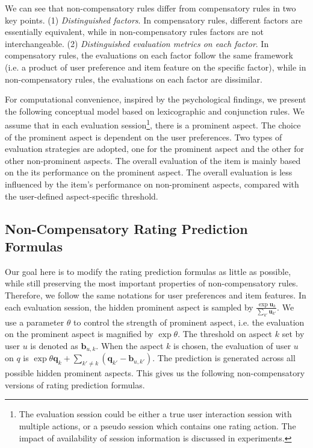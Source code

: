 \documentclass[letterpaper]{article} %
\begin{document}
We can see that non-compensatory rules differ from compensatory rules in two key points. (1) \textit{Distinguished factors}. In compensatory rules, different factors are essentially equivalent, while in non-compensatory rules factors are not interchangeable. (2) \textit{Distinguished evaluation metrics on each factor}. In compensatory rules, the evaluations on each factor follow the same framework (i.e. a product of user preference and item feature on the specific factor), while in non-compensatory rules, the evaluations on each factor are dissimilar.  

For computational convenience, inspired by the psychological findings, we present the following conceptual model based on lexicographic and conjunction rules. We assume that in each evaluation session\footnote{The evaluation session could be either a true user interaction session with multiple actions, or a pseudo session which contains one rating action. The impact of availability of session information is discussed in experiments. }, there is a prominent aspect. The choice of the prominent aspect is dependent on the user preferences. Two types of evaluation strategies are adopted, one for the prominent aspect and the other for other non-prominent aspects. The overall evaluation of the item is mainly based on the its performance on the prominent aspect. The overall evaluation is less influenced by the item's performance on non-prominent aspects, compared with the user-defined aspect-specific threshold.

 
\subsection{Non-Compensatory Rating Prediction Formulas}
Our goal here is to modify the rating prediction formulas as little as possible, while still preserving the most important properties of non-compensatory rules. Therefore, we follow the same notations for user preferences and item features. In each evaluation session, the hidden prominent aspect is sampled by $\frac{\exp \mathbf{u}_k}{\sum_{k'} \mathbf{u}_{k'}} $. We use a parameter $\theta$ to control the strength of prominent aspect, i.e. the evaluation on the prominent aspect is magnified by  $\exp \theta$. The threshold on aspect $k$ set by user $u$ is denoted as $\mathbf{b}_{u,k}$. When the aspect $k$ is chosen, the evaluation of user $u$ on $q$ is $\exp\theta \mathbf{q}_k  + \sum_{k'\neq k} (\mathbf{q}_{k'}-\mathbf{b}_{u,k'})$. The prediction is generated across all possible hidden prominent aspects. This gives us the following non-compensatory versions of rating prediction formulas.
\end{document}
